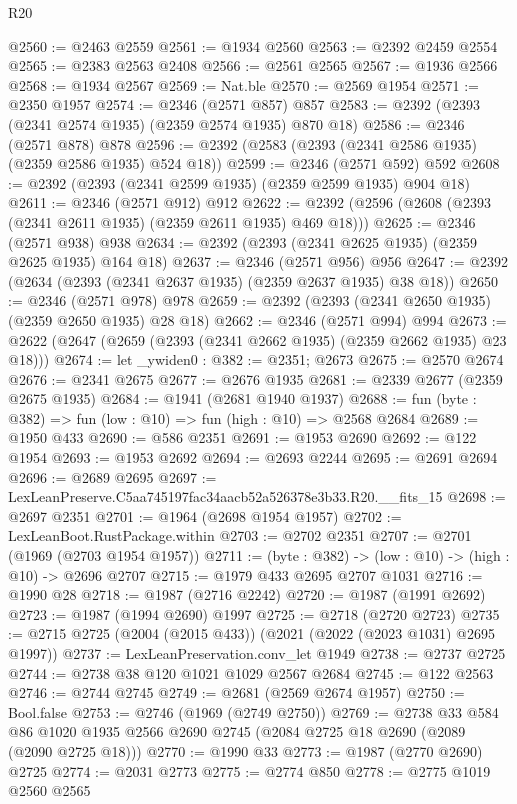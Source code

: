 \begin{lexlean}{R20}
\begin{coremodule}
@2560 := @2463 @2559
@2561 := @1934 @2560
@2563 := @2392 @2459 @2554
@2565 := @2383 @2563 @2408
@2566 := @2561 @2565
@2567 := @1936 @2566
@2568 := @1934 @2567
@2569 := Nat.ble
@2570 := @2569 @1954
@2571 := @2350 @1957
@2574 := @2346 (@2571 @857) @857
@2583 := @2392 (@2393 (@2341 @2574 @1935) (@2359 @2574 @1935) @870 @18)
@2586 := @2346 (@2571 @878) @878
@2596 := @2392 (@2583 (@2393 (@2341 @2586 @1935) (@2359 @2586 @1935) @524 @18))
@2599 := @2346 (@2571 @592) @592
@2608 := @2392 (@2393 (@2341 @2599 @1935) (@2359 @2599 @1935) @904 @18)
@2611 := @2346 (@2571 @912) @912
@2622 := @2392 (@2596 (@2608 (@2393 (@2341 @2611 @1935) (@2359 @2611 @1935) @469 @18)))
@2625 := @2346 (@2571 @938) @938
@2634 := @2392 (@2393 (@2341 @2625 @1935) (@2359 @2625 @1935) @164 @18)
@2637 := @2346 (@2571 @956) @956
@2647 := @2392 (@2634 (@2393 (@2341 @2637 @1935) (@2359 @2637 @1935) @38 @18))
@2650 := @2346 (@2571 @978) @978
@2659 := @2392 (@2393 (@2341 @2650 @1935) (@2359 @2650 @1935) @28 @18)
@2662 := @2346 (@2571 @994) @994
@2673 := @2622 (@2647 (@2659 (@2393 (@2341 @2662 @1935) (@2359 @2662 @1935) @23 @18)))
@2674 := let _ywiden0 : @382 := @2351; @2673
@2675 := @2570 @2674
@2676 := @2341 @2675
@2677 := @2676 @1935
@2681 := @2339 @2677 (@2359 @2675 @1935)
@2684 := @1941 (@2681 @1940 @1937)
@2688 := fun (byte : @382) => fun (low : @10) => fun (high : @10) => @2568 @2684
@2689 := @1950 @433
@2690 := @586 @2351
@2691 := @1953 @2690
@2692 := @122 @1954
@2693 := @1953 @2692
@2694 := @2693 @2244
@2695 := @2691 @2694
@2696 := @2689 @2695
@2697 := LexLeanPreserve.C5aa745197fac34aacb52a526378e3b33.R20.__fits_15
@2698 := @2697 @2351
@2701 := @1964 (@2698 @1954 @1957)
@2702 := LexLeanBoot.RustPackage.within
@2703 := @2702 @2351
@2707 := @2701 (@1969 (@2703 @1954 @1957))
@2711 := (byte : @382) -> (low : @10) -> (high : @10) -> @2696 @2707
@2715 := @1979 @433 @2695 @2707 @1031
@2716 := @1990 @28
@2718 := @1987 (@2716 @2242)
@2720 := @1987 (@1991 @2692)
@2723 := @1987 (@1994 @2690) @1997
@2725 := @2718 (@2720 @2723)
@2735 := @2715 @2725 (@2004 (@2015 @433)) (@2021 (@2022 (@2023 @1031) @2695 @1997))
@2737 := LexLeanPreservation.conv_let @1949
@2738 := @2737 @2725
@2744 := @2738 @38 @120 @1021 @1029 @2567 @2684
@2745 := @122 @2563
@2746 := @2744 @2745
@2749 := @2681 (@2569 @2674 @1957)
@2750 := Bool.false
@2753 := @2746 (@1969 (@2749 @2750))
@2769 := @2738
    @33
    @584
    @86
    @1020
    @1935
    @2566
    @2690
    @2745
    (@2084 @2725 @18 @2690 (@2089 (@2090 @2725 @18)))
@2770 := @1990 @33
@2773 := @1987 (@2770 @2690) @2725
@2774 := @2031 @2773
@2775 := @2774 @850
@2778 := @2775 @1019 @2560 @2565

\end{coremodule}
\end{lexlean}
